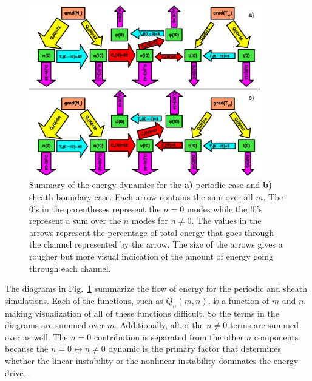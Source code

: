 \documentclass[showpacs,preprintnumbers,amsmath,amssymb,superscriptaddress,aip]{revtex4-1}
\begin{document}
\begin{figure}[!htbp]
\includegraphics[width=0.9\textwidth]{energy_diagrams}
\hfil
\caption{Summary of the energy dynamics for the \textbf{a)} periodic case and \textbf{b)} sheath boundary case. Each arrow contains the sum over all $m$. The 0's in the parentheses
represent the $n=0$ modes while the !0's represent a sum over the $n$ modes for $n \ne 0$. The values in the arrows represent the percentage of total energy that goes through the channel
represented by the arrow. The size of the arrows gives a rougher but more visual indication of the amount of energy going through each channel.}
\label{en_diagrams}
\end{figure}

The diagrams in Fig.~\ref{en_diagrams} summarize the flow of energy for the periodic and sheath simulations. Each of the functions, such as $Q_n(m,n)$, is a function of $m$ and $n$, making
visualization of all of these functions difficult. So the terms in the diagrams are summed over $m$. Additionally, all of the $n \ne 0$ terms are summed over as well.
The $n=0$ contribution is separated from the other $n$ components because
the $n=0 \leftrightarrow n \ne 0$ dynamic is the primary factor that determines whether the linear instability or the nonlinear instability dominates the energy drive~\cite{friedman2012b}.
\end{document}
